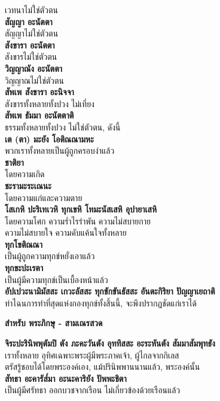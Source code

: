 \documentclass[12pt]{article}
\begin{document}
\indent เวทนาไม่ใช่ตัวตน\\
\textbf{สัญญา อะนัตตา\\}
\indent สัญญาไม่ใช่ตัวตน\\
\textbf{สังขารา อะนัตตา\\}
\indent สังขารไม่ใช่ตัวตน\\
\textbf{วิญญาณัง อะนัตตา\\}
\indent วิญญาณไม่ใช่ตัวตน\\
\textbf{สัพเพ สังขารา อะนิจจา\\}
\indent สังขารทั้งหลายทั้งปวง ไม่เที่ยง\\
\textbf{สัพเพ ธัมมา อะนัตตาติ\\}
\indent ธรรมทั้งหลายทั้งปวง ไม่ใช่ตัวตน, ดังนี้\\
\textbf{เต (ตา)  มะยัง โอติณณามหะ\\}
\indent พวกเราทั้งหลายเป็นผู้ถูกครอบงำแล้ว\\
\textbf{ชาติยา\\}
\indent โดยความเกิด\\
\textbf{ชะรามะระเณนะ\\}
\indent โดยความแก่และความตาย\\
\textbf{โสเกหิ ปะริเทเวหิ ทุกเขหิ โทมะนัสเสหิ อุปายาเสหิ\\}
\indent โดยความโศก ความร่ำไรรำพัน ความไม่สบายกาย\\
\indent ความไม่สบายใจ ความคับแค้นใจทั้งหลาย\\
\textbf{ทุกโขติณณา\\}
\indent เป็นผู้ถูกความทุกข์หยั่งเอาแล้ว\\
\textbf{ทุกขะปะเรตา\\}
\indent เป็นผู้มีความทุกข์เป็นเบื้องหน้าแล้ว\\
\textbf{อัปเปวะนามิมัสสะ เกวะลัสสะ ทุกขักขันธัสสะ อันตะกิริยา ปัญญาเยถาติ\\}
\indent ทำไฉนการทำที่สุดแห่งกองทุกข์ทั้งสิ้นนี้, จะพึงปรากฏชัดแก่เราได้\\
\begin{center}\textbf{สำหรับ พระภิกษุ - สามเณรสวด}\end{center}
\textbf{จิระปะรินิพพุตัมปิ ตัง ภะคะวันตัง อุททิสสะ อะระหันตัง สัมมาสัมพุทธัง\\}
\indent เราทั้งหลาย อุทิศเฉพาะพระผู้มีพระภาคเจ้า, ผู้ไกลจากกิเลส\\
\indent ตรัสรู้ชอบได้โดยพระองค์เอง, แม้ปรินิพพานนานแล้ว, พระองค์นั้น\\
\textbf{สัทธา อะคารัส๎มา อะนะคาริยัง ปัพพะชิตา\\}
\indent เป็นผู้มีศรัทธา ออกบวชจากเรือน ไม่เกี่ยวข้องด้วยเรือนแล้ว\\
\end{document}
